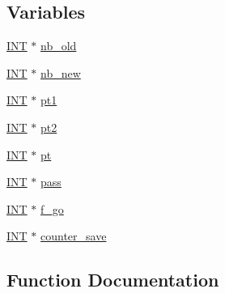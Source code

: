 \subsection*{Variables}
\begin{DoxyCompactItemize}
\item 
\mbox{\hyperlink{galois_8h_a09fddde158a3a20bd2dcadb609de11dc}{I\+NT}} $\ast$ \mbox{\hyperlink{clique__finder_8_c_a8d9f1ca146b0e8812e6e4f942d3ac411}{nb\+\_\+old}}
\item 
\mbox{\hyperlink{galois_8h_a09fddde158a3a20bd2dcadb609de11dc}{I\+NT}} $\ast$ \mbox{\hyperlink{clique__finder_8_c_a37476ac67ed8d39d88e2a95e999d5669}{nb\+\_\+new}}
\item 
\mbox{\hyperlink{galois_8h_a09fddde158a3a20bd2dcadb609de11dc}{I\+NT}} $\ast$ \mbox{\hyperlink{clique__finder_8_c_ae170b0dc139c709e902c286671b94cba}{pt1}}
\item 
\mbox{\hyperlink{galois_8h_a09fddde158a3a20bd2dcadb609de11dc}{I\+NT}} $\ast$ \mbox{\hyperlink{clique__finder_8_c_a94324c2f74f64c974008fbc2faeda805}{pt2}}
\item 
\mbox{\hyperlink{galois_8h_a09fddde158a3a20bd2dcadb609de11dc}{I\+NT}} $\ast$ \mbox{\hyperlink{clique__finder_8_c_aec1f1a2b30fdca8844c2932384483145}{pt}}
\item 
\mbox{\hyperlink{galois_8h_a09fddde158a3a20bd2dcadb609de11dc}{I\+NT}} $\ast$ \mbox{\hyperlink{clique__finder_8_c_aba24b5be3d3e0e4b86665c305ee69e1c}{pass}}
\item 
\mbox{\hyperlink{galois_8h_a09fddde158a3a20bd2dcadb609de11dc}{I\+NT}} $\ast$ \mbox{\hyperlink{clique__finder_8_c_ab941e77fa95ca4915294024f82a438cc}{f\+\_\+go}}
\item 
\mbox{\hyperlink{galois_8h_a09fddde158a3a20bd2dcadb609de11dc}{I\+NT}} $\ast$ \mbox{\hyperlink{clique__finder_8_c_ad7d589f4c9f1e616221d5cb2eda7cb88}{counter\+\_\+save}}
\end{DoxyCompactItemize}


\subsection{Function Documentation}
\mbox{\label{clique__finder_8_c_a6d34203fee35b94a881e8976dd9b842c}} 
